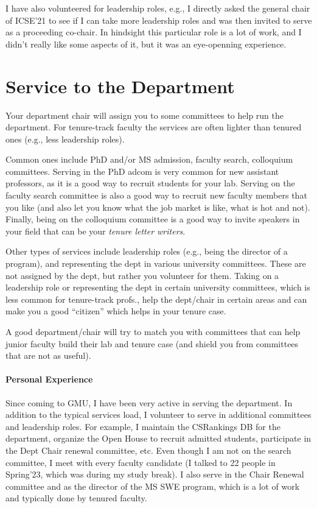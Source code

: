 \documentclass[oneside,11pt,dvipsnames]{book}
\begin{document}
I have also volunteered for leadership roles, e.g., I directly asked the general chair of ICSE'21 to see if I can take more leadership roles and was then invited to serve as a proceeding co-chair. In hindsight this particular role is a lot of work, and I didn't really like some aspects of it, but it was an eye-openning experience. 


\section{Service to the Department}\label{sec:services-dept}
Your department chair will assign you to some committees to help run the department.  For tenure-track faculty the services are often lighter than tenured ones (e.g., less leadership roles). 

Common ones include PhD and/or MS admission, faculty search,  colloquium committees. Serving in the PhD adcom is very common for new assistant professors, as it is a good way to recruit students for your lab. Serving on the faculty search committee is also a good way to recruit new faculty members that you like (and also let you know what the job market is like, what is hot and not). Finally, being on the colloquium committee is a good way to invite speakers in your field that can be your \emph{tenure letter writers}.

Other types of services include leadership roles (e.g., being the director of a program), and representing the dept in various university committees.
These are not assigned by the dept, but rather you volunteer for them. Taking on a leadership role or representing the dept in certain university committees, which is less common for tenure-track profs., help the dept/chair in certain areas and can make you a good ``citizen'' which helps in your tenure case.

A good department/chair will try to match you with committees that can help junior faculty build their lab and tenure case (and shield you from committees that are not as useful).


\paragraph{Personal Experience} Since coming to GMU, I have been very active in serving the department.  In addition to the typical services load, I volunteer to serve in additional committees and leadership roles. For example, I maintain the CSRankings DB for the department, organize the Open House to recruit admitted students, participate in the Dept Chair renewal committee, etc.
Even though I am not on the search committee, I meet with every faculty candidate (I talked to 22 people in Spring'23, which was during my study break). I also serve in the Chair Renewal committee and as the director of the MS SWE program, which is a lot of work and typically done by tenured faculty. 
\end{document}
